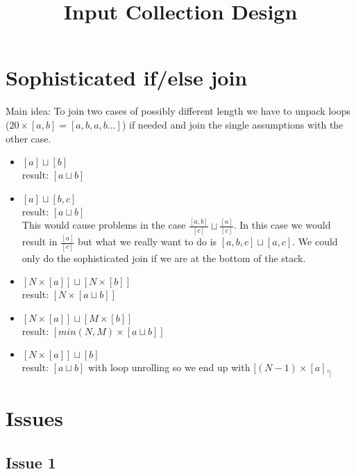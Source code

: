 \documentclass[11pt]{article}
\begin{document}
\title{Input Collection Design}

\maketitle


\section{Sophisticated if/else join}

Main idea: To join two cases of possibly different length we have to unpack loops ($20 \times [a, b] = [a, b, a, b ...]$) if needed and join the single assumptions with the other case.

\begin{itemize}
  \item $[a] \sqcup [b]$\\
  result: $[a \sqcup b]$
  \item $[a] \sqcup [b, c]$\\
  result: $[a \sqcup b]$\\
  This would cause problems in the case $\frac{[a, b]}{[c]} \sqcup \frac{[a]}{[c]}$. In this case we would result in $\frac{[a]}{[c]}$ but what we really want to do is $[a, b, c] \sqcup [a, c]$. We could only do the sophisticated join if we are at the bottom of the stack.
  \item $[N \times [a]] \sqcup [N \times [b]]$\\
  result: $[N \times [a \sqcup b]]$
  \item $[N \times [a]] \sqcup [M \times [b]]$\\
  result: $[min(N,M) \times [a \sqcup b]]$
  \item $[N \times [a]] \sqcup [b]$\\
  result: $[a \sqcup b]$ with loop unrolling so we end up with $[(N-1) \times [a], _]$
\end{itemize}


\section{Issues}

\subsection{Issue 1}
\end{document}
